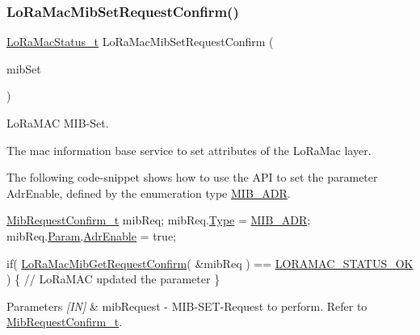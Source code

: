 \subsubsection{\texorpdfstring{Lo\+Ra\+Mac\+Mib\+Set\+Request\+Confirm()}{LoRaMacMibSetRequestConfirm()}}
{\footnotesize\ttfamily \hyperlink{group__LORAMAC_ga30bd25657e10480f8605ee951b0ecfbd}{Lo\+Ra\+Mac\+Status\+\_\+t} Lo\+Ra\+Mac\+Mib\+Set\+Request\+Confirm (\begin{DoxyParamCaption}\item[{\hyperlink{group__LORAMAC_ga9269d5ae88dd157a58e9d60f680d63f0}{Mib\+Request\+Confirm\+\_\+t} $\ast$}]{mib\+Set }\end{DoxyParamCaption})}



Lo\+Ra\+M\+AC M\+I\+B-\/\+Set. 

The mac information base service to set attributes of the Lo\+Ra\+Mac layer.

The following code-\/snippet shows how to use the A\+PI to set the parameter Adr\+Enable, defined by the enumeration type \hyperlink{group__LORAMAC_gga32ea83d13a3f5bb4b3ec2ace2319ab61a756ff0b66217e3e4ddd0442c8aa56802}{M\+I\+B\+\_\+\+A\+DR}.


\begin{DoxyCode}
\hyperlink{structeMibRequestConfirm}{MibRequestConfirm\_t} mibReq;
mibReq.\hyperlink{structeMibRequestConfirm_ad3d963c102bbd81f7dd9918f4c1731c1}{Type} = \hyperlink{group__LORAMAC_gga32ea83d13a3f5bb4b3ec2ace2319ab61a756ff0b66217e3e4ddd0442c8aa56802}{MIB\_ADR};
mibReq.\hyperlink{structeMibRequestConfirm_a71cc0adf3fe8337eaa6dc69a1463c8bc}{Param}.\hyperlink{unionuMibParam_ab178fe02b29604d3996b55e72ebc39b6}{AdrEnable} = \textcolor{keyword}{true};

\textcolor{keywordflow}{if}( \hyperlink{group__LORAMAC_ga3e208a4f73213aa801eeb9d9da7b71dd}{LoRaMacMibGetRequestConfirm}( &mibReq ) == 
      \hyperlink{group__LORAMAC_gga1d18f26b344040b3ec5c3db662919661a03db5fca052313edb3823c014b653a74}{LORAMAC\_STATUS\_OK} )
\{
  \textcolor{comment}{// LoRaMAC updated the parameter}
\}
\end{DoxyCode}



\begin{DoxyParams}{Parameters}
{\em \mbox{[}\+I\+N\mbox{]}} & mib\+Request -\/ M\+I\+B-\/\+S\+E\+T-\/\+Request to perform. Refer to \hyperlink{group__LORAMAC_ga9269d5ae88dd157a58e9d60f680d63f0}{Mib\+Request\+Confirm\+\_\+t}.\\
\hline
\end{DoxyParams}

